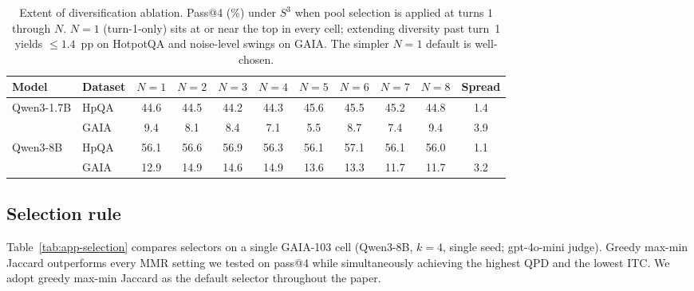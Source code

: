\begin{table}[t]
\centering
\small
\setlength{\tabcolsep}{5pt}
\renewcommand{\arraystretch}{1.05}
\begin{tabular}{l l *{8}{c} c}
\toprule
\textbf{Model} & \textbf{Dataset}
& $N{=}1$ & $N{=}2$ & $N{=}3$ & $N{=}4$
& $N{=}5$ & $N{=}6$ & $N{=}7$ & $N{=}8$ & Spread \\
\midrule
\multirow{2}{*}{Qwen3-1.7B}
 & HpQA & 44.6 & 44.5 & 44.2 & 44.3 & 45.6 & 45.5 & 45.2 & 44.8 & 1.4 \\
 & GAIA &  9.4 &  8.1 &  8.4 &  7.1 &  5.5 &  8.7 &  7.4 &  9.4 & 3.9 \\
\multirow{2}{*}{Qwen3-8B}
 & HpQA & 56.1 & 56.6 & 56.9 & 56.3 & 56.1 & 57.1 & 56.1 & 56.0 & 1.1 \\
 & GAIA & 12.9 & 14.9 & 14.6 & 14.9 & 13.6 & 13.3 & 11.7 & 11.7 & 3.2 \\
\bottomrule
\end{tabular}
\caption{Extent of diversification ablation. Pass@4 (\%) under
$S^3$ when pool selection is applied at turns $1$ through $N$.
$N{=}1$ (turn-1-only) sits at or near the top in every cell;
extending diversity past turn~1 yields $\le 1.4$~pp on HotpotQA
and noise-level swings on GAIA. The simpler $N{=}1$ default is
well-chosen.}
\label{tab:app-extent}
\end{table}

\subsection{Selection rule}
\label{app:selection}

Table~\ref{tab:app-selection} compares selectors on a single GAIA-103
cell (Qwen3-8B, $k{=}4$, single seed; gpt-4o-mini judge). Greedy
max-min Jaccard outperforms every MMR setting we tested on
pass@4 while simultaneously achieving the highest QPD and the
lowest ITC. We adopt greedy max-min Jaccard as the default
selector throughout the paper.

